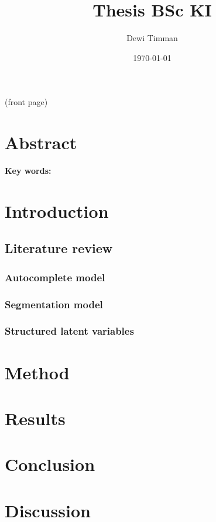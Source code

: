 \documentclass{article}
\title{Thesis BSc KI}
\author{Dewi Timman}
\date{\today}
\begin{document}
\maketitle

(front page)
\section*{Abstract}
\textbf{Key words:} 

\section{Introduction}

\subsection{Literature review}

\subsubsection{Autocomplete model}

\subsubsection{Segmentation model}

\subsubsection{Structured latent variables}

\section{Method}

\section{Results}

\section{Conclusion}

\section{Discussion}
\end{document}
